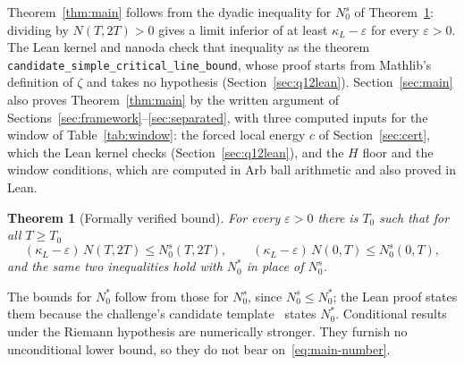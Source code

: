 \documentclass[11pt]{article}
\newtheorem{theorem}{Theorem}[section]
\theoremstyle{definition}
\newcommand{\eps}{\varepsilon}
\begin{document}
Theorem~\ref{thm:main} follows from the dyadic inequality for $N_0^s$ of
Theorem~\ref{thm:formal}: dividing by $N(T,2T)>0$ gives a limit inferior of at
least $\kappa_L-\eps$ for every $\eps>0$. The Lean kernel and nanoda check that
inequality as the theorem \texttt{candidate\_simple\_critical\_line\_bound},
whose proof starts from Mathlib's definition of $\zeta$ and takes no
hypothesis (Section~\ref{sec:q12lean}). Section~\ref{sec:main} also proves
Theorem~\ref{thm:main} by the written argument of
Sections~\ref{sec:framework}--\ref{sec:separated}, with three computed inputs
for the window of Table~\ref{tab:window}: the forced local energy $c$ of
Section~\ref{sec:cert}, which the Lean kernel checks
(Section~\ref{sec:q12lean}), and the $H$ floor and the window conditions,
which are computed in Arb ball arithmetic and also proved in Lean.

\begin{theorem}[Formally verified bound]\label{thm:formal}
For every $\eps>0$ there is $T_0$ such that for all $T\ge T_0$
\[
  (\kappa_L-\eps)\,N(T,2T)\le N_0^s(T,2T),\qquad
  (\kappa_L-\eps)\,N(0,T)\le N_0^s(0,T),
\]
and the same two inequalities hold with $N_0^*$ in place of $N_0^s$.
\end{theorem}

The bounds for $N_0^*$ follow from those for $N_0^s$, since
$N_0^s\le N_0^*$; the Lean proof states them because the challenge's
candidate template~\cite{RZF26} states $N_0^*$.
Conditional results under the Riemann
hypothesis are numerically stronger. They furnish no unconditional lower
bound, so they do not bear on~\eqref{eq:main-number}.
\end{document}
